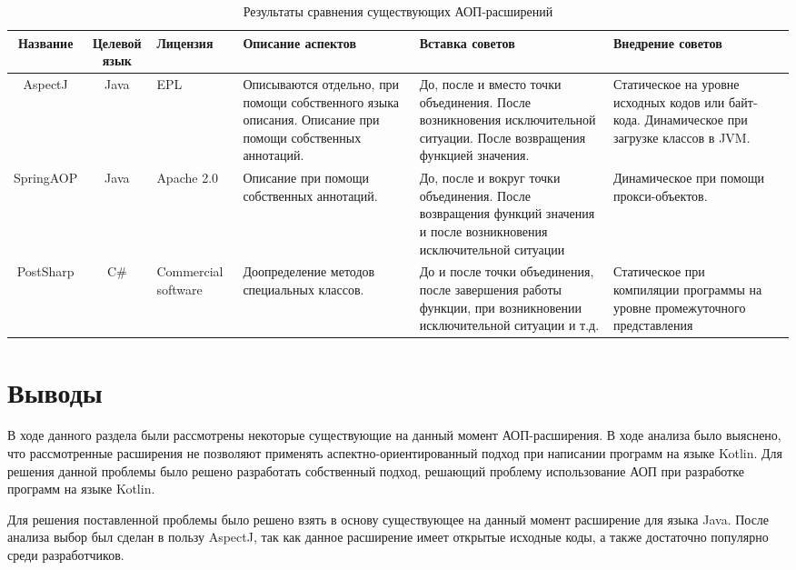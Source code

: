 \begin{sidewaystable}
\caption{Результаты сравнения существующих АОП-расширений}
\scriptsize
\begin{tabularx}{\textwidth}{|c|c|X|X|X|X|X|}
\hline
Название & Целевой язык & Лицензия & Описание аспектов & Вставка советов& Внедрение советов \\ \hline
AspectJ & Java & EPL & Описываются отдельно, при помощи собственного языка описания. Описание при помощи собственных аннотаций. & До, после и вместо точки объединения. После возникновения исключительной ситуации. После возвращения функцией значения. & Статическое на уровне исходных кодов или байт-кода. Динамическое при загрузке классов в JVM. \\ \hline
SpringAOP & Java & Apache 2.0 & Описание при помощи собственных аннотаций. & До, после и вокруг точки объединения. После возвращения функций значения и после возникновения исключительной ситуации & Динамическое при помощи прокси-объектов. \\ \hline
PostSharp & C\# & Commercial software & Доопределение методов специальных классов. & До и после точки объединения, после завершения работы функции, при возникновении исключительной ситуации и т.д. & Статическое при компиляции программы на уровне промежуточного представления \\ \hline
\end{tabularx}
\label{tab:comparison_results}
\end{sidewaystable}
\section{Выводы}
\label{sec:cap_1_conclusion}
В ходе данного раздела были рассмотрены некоторые существующие на данный момент
АОП-расширения.
В ходе анализа было выяснено, что рассмотренные расширения не позволяют
применять аспектно-ориентированный подход при написании программ на языке
Kotlin.
Для решения данной проблемы было решено разработать собственный подход, решающий
проблему использование АОП при разработке программ на языке Kotlin.

Для решения поставленной проблемы было решено взять в основу существующее на
данный момент расширение для языка Java.
После анализа выбор был сделан в пользу AspectJ, так как данное расширение имеет
открытые исходные коды, а также достаточно популярно среди разработчиков.
